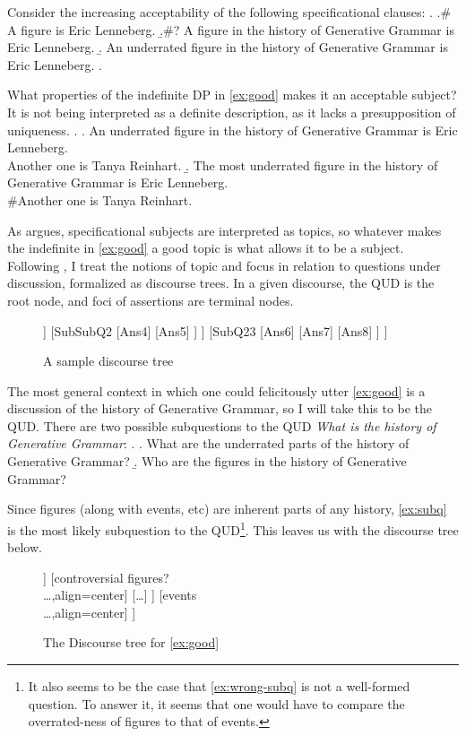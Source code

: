 \documentclass[letterpaper]{article}
\begin{document}
Consider the increasing acceptability of the following specificational clauses:
\ex.
\a.\label{ex:bad}\# A figure is Eric Lenneberg.
\b.\label{ex:so-so}\#? A figure in the history of Generative Grammar is Eric Lenneberg.
\b.\label{ex:good} An underrated figure in the history of Generative Grammar is Eric Lenneberg.
\z.

What properties of the indefinite DP in \ref{ex:good} makes it an acceptable subject?
It is not being interpreted as a definite description, as it lacks a presupposition of uniqueness.
\ex.
\a. An underrated figure in the history of Generative Grammar is Eric Lenneberg.\\
Another one is Tanya Reinhart.
\b. The most underrated figure in the history of Generative Grammar is Eric Lenneberg.\\
\#Another one is Tanya Reinhart.

As \textcite{mikkelsen2004specifying} argues, specificational subjects are interpreted as topics, so whatever makes the indefinite in \ref{ex:good} a good topic is what allows it to be a subject.
Following \textcite{buring1999topic,roberts2012information}, I treat the notions of topic and focus in relation to questions under discussion, formalized as discourse trees.
In a given discourse, the QUD is the root node, and foci of assertions are terminal nodes.
\begin{figure}[h]
  \centering
  \begin{forest}
    [QUD 
      [SubQ1
	[SubSubQ1
	  [Ans1]
	  [Ans2]
	  [Ans3]
	]
	[SubSubQ2
	  [Ans4]
	  [Ans5]
	]
      ]
      [SubQ23
	[Ans6]
	[Ans7]
	[Ans8]
      ]
    ]
  \end{forest}
  \caption{A sample discourse tree}
  \label{fig:dtree}
\end{figure}

The most general context in which one could felicitously utter \ref{ex:good} is a discussion of the history of Generative Grammar, so I will take this to be the QUD.
There are two possible subquestions to the QUD \textit{What is the history of Generative Grammar}:
\ex.
\a.\label{ex:wrong-subq} What are the underrated parts of the history of Generative Grammar?
\b.\label{ex:subq} Who are the figures in the history of Generative Grammar?

Since figures (along with events, etc) are inherent parts of any history, \ref{ex:subq} is the most likely subquestion to the QUD\footnote{It also seems to be the case that \ref{ex:wrong-subq} is not a well-formed question. To answer it, it seems that one would have to compare the overrated-ness of figures to that of events.}.
This leaves us with the discourse tree below.
\begin{figure}[h]
  \centering
  \begin{forest}
    [What is the history of Generative Grammar?
      [figures?
	[underrated figures?
	  [Eric Lenneberg]
	  [Tanya Reinhart]
	  [\ldots]
	]
	[controversial figures?\\
	  \ldots,align=center]
	[\ldots]
      ]
      [events\\
	\ldots,align=center]
    ]
  \end{forest}
  \caption{The Discourse tree for \ref{ex:good}}
  \label{fig:good-dtree}
\end{figure}
\end{document}
